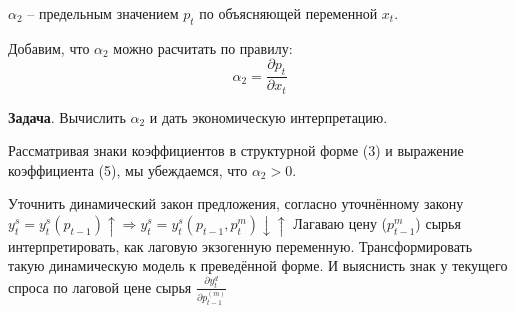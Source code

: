 \documentclass[12pt,a4paper]{article}
\begin{document}
$\alpha_2$ -- предельным значением $p_t$ по объясняющей переменной $x_t$. 

Добавим, что $\alpha_2$ можно расчитать по правилу:
\begin{equation}
\alpha_2 = \frac{\partial p_t}{\partial x_t}
\end{equation}

\textbf{Задача}. Вычислить $\alpha_2$ и дать экономическую интерпретацию. 

Рассматривая знаки коэффициентов в структурной форме (3) и выражение коэффициента (5), мы убеждаемся, что $\alpha_2 > 0$.

 Уточнить динамический закон предложения, согласно уточнённому закону
$y_t^s = y_t^s(p_{t-1})\uparrow  \Rightarrow y_t^s = y_t^s(p_{t-1}, p_t^m)\downarrow \uparrow$
Лагаваю цену ($p_{t-1}^m$) сырья интерпретировать, как лаговую экзогенную переменную. Трансформировать такую динамическую модель к преведённой форме. И выяснисть знак у текущего спроса по лаговой цене сырья $\displaystyle{\frac{\partial y_t^d}{\partial p_{t-1}^{(m)}}}$
\end{document}
